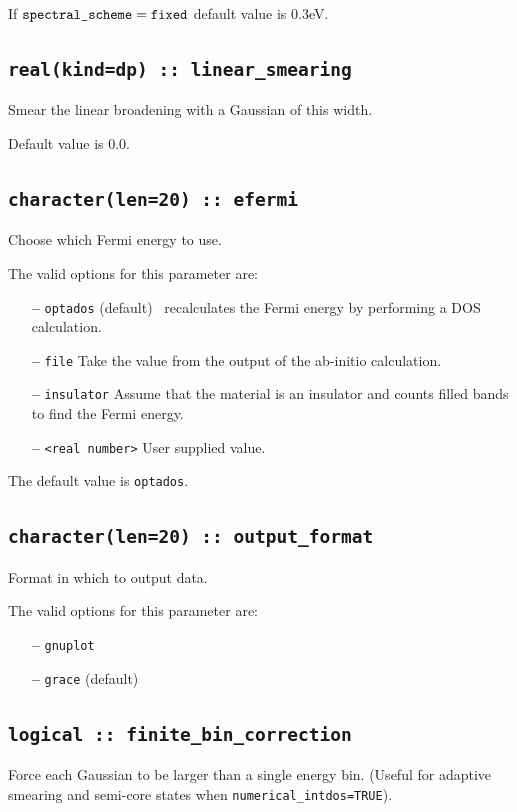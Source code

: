 \documentclass[a4paper,11pt,twoside]{book}
\begin{document}
{If $\verb#spectral_scheme# = \verb#fixed#$ default value is 0.3eV.


\subsection[adaptive\_smearing]{\tt real(kind=dp) :: linear\_smearing}
Smear the linear broadening with a Gaussian of this width.

Default value is 0.0.

\subsection[compute\_efermi]{{\tt character(len=20) :: efermi}}
Choose which Fermi energy to use.

The valid options for this parameter are:
\begin{itemize}
\item[{\bf --}]  \verb#optados# (default) \optados\ recalculates the Fermi energy by performing a DOS calculation.
\item[{\bf --}]  \verb#file# Take the value from the output of the ab-initio calculation.
\item[{\bf --}]  \verb#insulator# Assume that the material is an insulator and counts filled bands to find the Fermi energy.
\item[{\bf --}]  \verb#<real number># User supplied value.
\end{itemize}

The default value is {\tt optados}.


\subsection[output\_format]{\tt character(len=20) :: output\_format}
Format in which to output data.

The valid options for this parameter are:
\begin{itemize}
\item[{\bf --}]  \verb#gnuplot#
\item[{\bf --}]  \verb#grace# (default)
\end{itemize}

\subsection[finite\_bin\_correction]{\tt logical :: finite\_bin\_correction}
Force each Gaussian to be larger than a single energy bin. (Useful for adaptive smearing and semi-core states when \verb#numerical_intdos=TRUE#).

}
\end{document}
